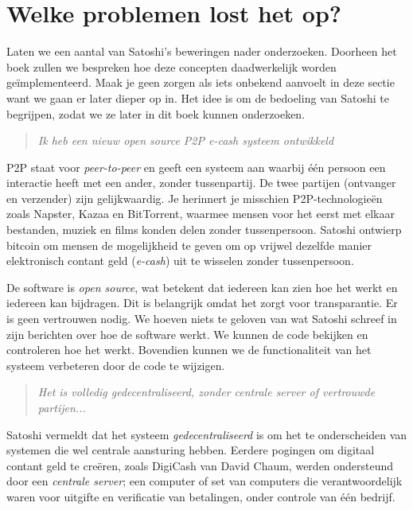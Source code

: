 \section{Welke problemen lost het op?}

Laten we een aantal van Satoshi's beweringen nader onderzoeken. Doorheen het boek zullen we bespreken hoe deze concepten daadwerkelijk worden geïmplementeerd. Maak je geen zorgen als iets onbekend aanvoelt in deze sectie want we gaan er later dieper op in. Het idee is om de bedoeling van Satoshi te begrijpen, zodat we ze later in dit boek kunnen onderzoeken.

\begin{quote}
\textit{Ik heb een nieuw open source P2P e-cash systeem ontwikkeld}
\end{quote}

P2P staat voor \textit{peer-to-peer} en geeft een systeem aan waarbij één persoon een interactie heeft met een ander, zonder tussenpartij. De twee partijen (ontvanger en verzender) zijn gelijkwaardig. Je herinnert je misschien P2P-technologieën zoals Napster, Kazaa en BitTorrent, waarmee mensen voor het eerst met elkaar bestanden, muziek en films konden delen zonder tussenpersoon. Satoshi ontwierp bitcoin om mensen de mogelijkheid te geven om op vrijwel dezelfde manier elektronisch contant geld (\textit{e-cash}) uit te wisselen zonder tussenpersoon.

De software is \textit{open source}, wat betekent dat iedereen kan zien hoe het werkt en iedereen kan bijdragen. Dit is belangrijk omdat het zorgt voor transparantie. Er is geen vertrouwen nodig. We hoeven niets te geloven van wat Satoshi schreef in zijn berichten over hoe de software werkt. We kunnen de code bekijken en controleren hoe het werkt. Bovendien kunnen we de functionaliteit van het systeem verbeteren door de code te wijzigen.

\begin{quote}
\textit{Het is volledig gedecentraliseerd, zonder centrale server of vertrouwde partijen...}
\end{quote}

Satoshi vermeldt dat het systeem \textit{gedecentraliseerd} is om het te onderscheiden van systemen die wel centrale aansturing hebben. Eerdere pogingen om digitaal contant geld te creëren, zoals DigiCash van David Chaum, werden ondersteund door een \textit{centrale server}; een computer of set van computers die verantwoordelijk waren voor uitgifte en verificatie van betalingen, onder controle van één bedrijf.

